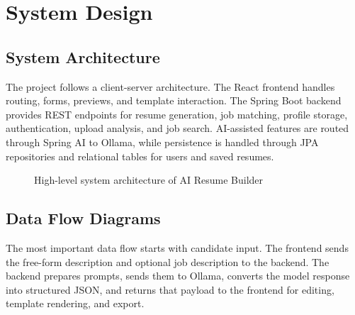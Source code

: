 \section{System Design}
\subsection{System Architecture}
\noindent The project follows a client-server architecture. The React frontend handles routing, forms, previews, and template interaction. The Spring Boot backend provides REST endpoints for resume generation, job matching, profile storage, authentication, upload analysis, and job search. AI-assisted features are routed through Spring AI to Ollama, while persistence is handled through JPA repositories and relational tables for users and saved resumes.

\begin{figure}[H]
\centering
{}
\caption{High-level system architecture of AI Resume Builder}
\end{figure}

\subsection{Data Flow Diagrams}
\noindent The most important data flow starts with candidate input. The frontend sends the free-form description and optional job description to the backend. The backend prepares prompts, sends them to Ollama, converts the model response into structured JSON, and returns that payload to the frontend for editing, template rendering, and export.

